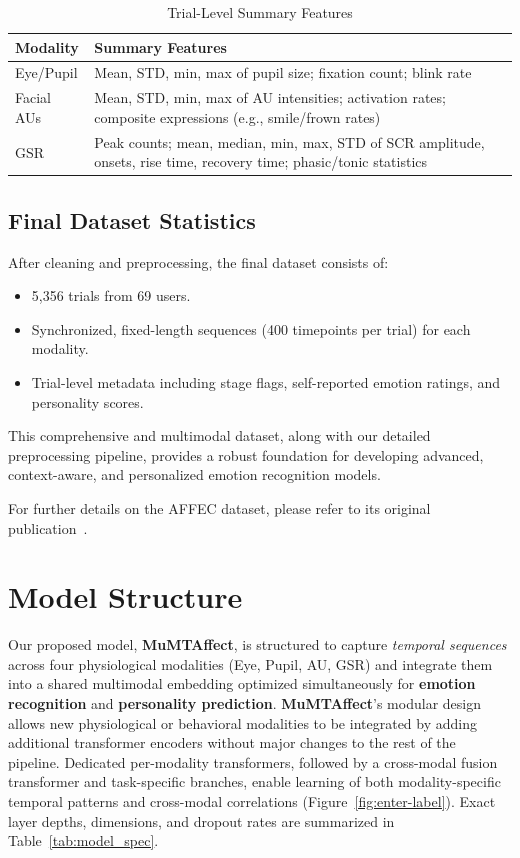 \documentclass[sigconf]{acmart}
\begin{document}
\begin{table}[ht]
\centering
\caption{Trial-Level Summary Features}
\label{tab:trial_features}
\begin{tabular}{ll}
\toprule
\textbf{Modality} & \textbf{Summary Features} \\
\midrule
Eye/Pupil     & Mean, STD, min, max of pupil size; fixation count; blink rate \\
Facial AUs    & Mean, STD, min, max of AU intensities; activation rates; composite expressions (e.g., smile/frown rates) \\
GSR           & Peak counts; mean, median, min, max, STD of SCR amplitude, onsets, rise time, recovery time; phasic/tonic statistics \\
\bottomrule
\end{tabular}
\end{table}

\subsection{Final Dataset Statistics}
After cleaning and preprocessing, the final dataset consists of:
\begin{itemize}
    \item 5,356 trials from 69 users.
    \item Synchronized, fixed-length sequences (400 timepoints per trial) for each modality.
    \item Trial-level metadata including stage flags, self-reported emotion ratings, and personality scores.
\end{itemize}

This comprehensive and multimodal dataset, along with our detailed preprocessing pipeline, provides a robust foundation for developing advanced, context-aware, and personalized emotion recognition models.

For further details on the AFFEC dataset, please refer to its original publication~\cite{j2025affec}.


\section{Model Structure}
\label{sec:model_structure}

Our proposed model, \textbf{MuMTAffect}, is structured to capture \emph{temporal sequences} across four physiological modalities (Eye, Pupil, AU, GSR) and integrate them into a shared multimodal embedding optimized simultaneously for \textbf{emotion recognition} and \textbf{personality prediction}. \textbf{MuMTAffect}'s modular design allows new physiological or behavioral modalities to be integrated by adding additional transformer encoders without major changes to the rest of the pipeline. Dedicated per-modality transformers, followed by a cross-modal fusion transformer and task-specific branches, enable learning of both modality-specific temporal patterns and cross-modal correlations (Figure~\ref{fig:enter-label}). Exact layer depths, dimensions, and dropout rates are summarized in Table~\ref{tab:model_spec}.
\end{document}
